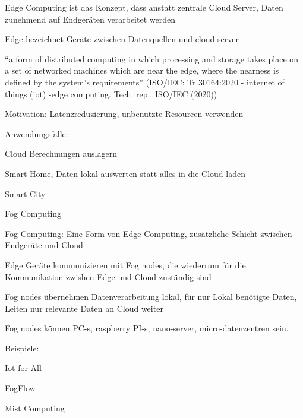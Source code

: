 \begin{notes}
\begin{notes}
\begin{notes}
            \item Edge Computing ist das Konzept, dass anstatt zentrale Cloud Server, Daten zunehmend auf Endgeräten verarbeitet werden \cite{Shi2016}
            \item Edge bezeichnet Geräte zwischen Datenquellen und cloud server
            \item “a form of distributed computing in which processing and storage takes place on a set of networked machines which are near the edge, where the nearness is defined by the system’s requirements”  (ISO/IEC: Tr 30164:2020 - internet of things (iot) -edge computing. Tech. rep., ISO/IEC (2020))
            \item Motivation: Latenzreduzierung, unbenutzte Resourcen verwenden
            \item Anwendungsfälle:
            \begin{notes}
                \item Cloud Berechnungen auslagern
                \item Smart Home, Daten lokal auswerten statt alles in die Cloud laden
                \item Smart City
            \end{notes}
        \end{notes}
        \item Fog Computing
        \begin{notes} 
            \item Fog Computing: Eine Form von Edge Computing, zusätzliche Schicht zwischen Endgeräte und Cloud
            \item Edge Geräte kommunizieren mit Fog nodes, die wiederrum für die Kommunikation zwishen Edge und Cloud zuständig sind
            \item Fog nodes übernehmen Datenverarbeitung lokal, für nur Lokal benötigte Daten, Leiten nur relevante Daten an Cloud weiter
            \item Fog nodes können PC-s, raspberry PI-s, nano-server, micro-datenzentren sein. \cite{Mahmud2020}
            \item Beispiele:
            \begin{notes} 
                \item Iot for All
                \item FogFlow
            \end{notes}
        \end{notes}
        \item Mist Computing
        \begin{notes} 

\end{notes}
\end{notes}
\end{notes}
